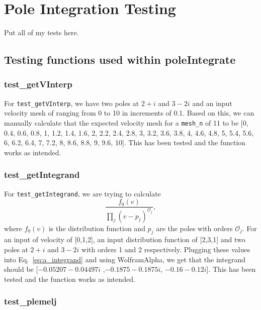 \chapter{Pole Integration Testing}

Put all of my tests here. 

\section{Testing functions used within poleIntegrate}

\subsection{test\_getVInterp}
For \verb|test_getVInterp|, we have two poles at $2+i$ and $3-2i$ 
and an input velocity mesh of ranging from 0 to 10 in increments of 0.1.
Based on this, we can manually calculate that the expected velocity mesh for a \verb|mesh_n| of 11 to be
[0, 0.4, 0.6, 0.8, 1, 1.2, 1.4, 1.6, 2, 2.2, 2.4, 2.8, 3, 3.2, 3.6, 3.8, 4, 4.6, 4.8, 5, 5.4, 5.6, 6, 6.2, 6.4, 7, 7.2, 8, 8.6, 8.8, 9, 9.6, 10]. 
This has been tested and the function works as intended.

\subsection{test\_getIntegrand}
For \verb|test_getIntegrand|, we are trying to calculate 
\begin{equation}
	\frac{f_0(v)}{\prod_j (v-p_j)^{\mathcal{O}_j}},
	\label{eq:a_integrand}
\end{equation}
where $f_0(v)$ is the distribution function and $p_j$ are the poles with orders $\mathcal{O}_j$.
For an input of velocity of [0,1,2], an input distribution function of [2,3,1]
and two poles at $2+i$ and $3-2i$ with orders 1 and 2 respectively. 
Plugging these values into Eq.~\ref{eq:a_integrand} and using WolframAlpha, we get that the integrand should be
[$-0.05207-0.04497i$ ,$-0.1875-0.1875i$, $-0.16-0.12i$].
This has been tested and the function works as intended.

\subsection{test\_plemelj}

